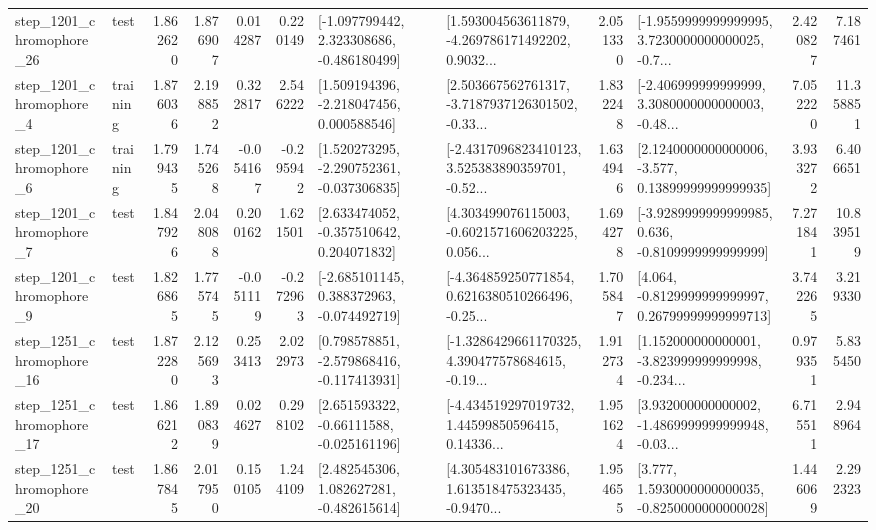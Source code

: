 \begin{tabular}{llrrrrllrlrr}
 step\_1201\_chromophore\_26 &      test &      1.862620 &    1.876907 &      0.014287 &  0.220149 &   [-1.097799442, 2.323308686, -0.486180499] &  [1.593004563611879, -4.269786171492202, 0.9032... &       2.051330 &  [-1.9559999999999995, 3.7230000000000025, -0.7... &            2.420827 &          7.187461 \\
  step\_1201\_chromophore\_4 &  training &      1.876036 &    2.198852 &      0.322817 &  2.546222 &    [1.509194396, -2.218047456, 0.000588546] &  [2.503667562761317, -3.7187937126301502, -0.33... &       1.832248 &  [-2.406999999999999, 3.3080000000000003, -0.48... &            7.052220 &         11.358851 \\
  step\_1201\_chromophore\_6 &  training &      1.799435 &    1.745268 &     -0.054167 & -0.295942 &   [1.520273295, -2.290752361, -0.037306835] &  [-2.4317096823410123, 3.525383890359701, -0.52... &       1.634946 &  [2.1240000000000006, -3.577, 0.13899999999999935] &            3.933272 &          6.406651 \\
  step\_1201\_chromophore\_7 &      test &      1.847926 &    2.048088 &      0.200162 &  1.621501 &    [2.633474052, -0.357510642, 0.204071832] &  [4.303499076115003, -0.6021571606203225, 0.056... &       1.694278 &  [-3.9289999999999985, 0.636, -0.8109999999999999] &            7.271841 &         10.839519 \\
  step\_1201\_chromophore\_9 &      test &      1.826865 &    1.775745 &     -0.051119 & -0.272963 &   [-2.685101145, 0.388372963, -0.074492719] &  [-4.364859250771854, 0.6216380510266496, -0.25... &       1.705847 &  [4.064, -0.8129999999999997, 0.26799999999999713] &            3.742265 &          3.219330 \\
 step\_1251\_chromophore\_16 &      test &      1.872280 &    2.125693 &      0.253413 &  2.022973 &   [0.798578851, -2.579868416, -0.117413931] &  [-1.3286429661170325, 4.390477578684615, -0.19... &       1.912734 &  [1.152000000000001, -3.823999999999998, -0.234... &            0.979351 &          5.835450 \\
 step\_1251\_chromophore\_17 &      test &      1.866212 &    1.890839 &      0.024627 &  0.298102 &    [2.651593322, -0.66111588, -0.025161196] &  [-4.434519297019732, 1.44599850596415, 0.14336... &       1.951624 &  [3.932000000000002, -1.4869999999999948, -0.03... &            6.715511 &          2.948964 \\
 step\_1251\_chromophore\_20 &      test &      1.867845 &    2.017950 &      0.150105 &  1.244109 &    [2.482545306, 1.082627281, -0.482615614] &  [4.305483101673386, 1.613518475323435, -0.9470... &       1.954655 &   [3.777, 1.5930000000000035, -0.8250000000000028] &            1.446069 &          2.292323 \\

\end{tabular}
